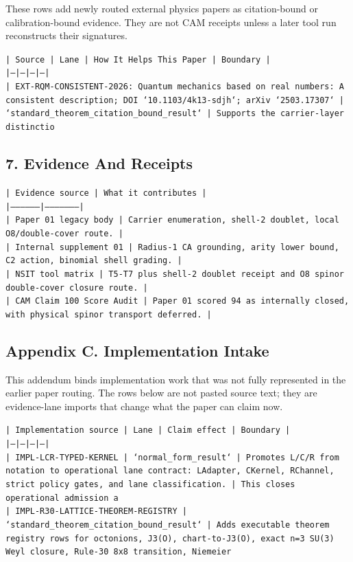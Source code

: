 \documentclass[11pt]{article}
\begin{document}
These rows add newly routed external physics papers as citation-bound or calibration-bound evidence. They are not CAM receipts unless a later tool run reconstructs their signatures.

\noindent\texttt{| Source | Lane | How It Helps This Paper | Boundary |}\\
\noindent\texttt{|---|---|---|---|}\\
\noindent\texttt{| EXT-RQM-CONSISTENT-2026: Quantum mechanics based on real numbers: A consistent description; DOI `10.1103/4k13-sdjh`; arXiv `2503.17307` | `standard\_theorem\_citation\_bound\_result` | Supports the carrier-layer distinctio}\\

\subsection*{7. Evidence And Receipts}

\noindent\texttt{| Evidence source | What it contributes |}\\
\noindent\texttt{|-----------------|---------------------|}\\
\noindent\texttt{| Paper 01 legacy body | Carrier enumeration, shell-2 doublet, local O8/double-cover route. |}\\
\noindent\texttt{| Internal supplement 01 | Radius-1 CA grounding, arity lower bound, C2 action, binomial shell grading. |}\\
\noindent\texttt{| NSIT tool matrix | T5-T7 plus shell-2 doublet receipt and O8 spinor double-cover closure route. |}\\
\noindent\texttt{| CAM Claim 100 Score Audit | Paper 01 scored 94 as internally closed, with physical spinor transport deferred. |}\\

\subsection*{Appendix C. Implementation Intake}

This addendum binds implementation work that was not fully represented in the earlier paper routing. The rows below are not pasted source text; they are evidence-lane imports that change what the paper can claim now.

\noindent\texttt{| Implementation source | Lane | Claim effect | Boundary |}\\
\noindent\texttt{|---|---|---|---|}\\
\noindent\texttt{| IMPL-LCR-TYPED-KERNEL | `normal\_form\_result` | Promotes L/C/R from notation to operational lane contract: LAdapter, CKernel, RChannel, strict policy gates, and lane classification. | This closes operational admission a}\\
\noindent\texttt{| IMPL-R30-LATTICE-THEOREM-REGISTRY | `standard\_theorem\_citation\_bound\_result` | Adds executable theorem registry rows for octonions, J3(O), chart-to-J3(O), exact n=3 SU(3) Weyl closure, Rule-30 8x8 transition, Niemeier }\\
\end{document}
